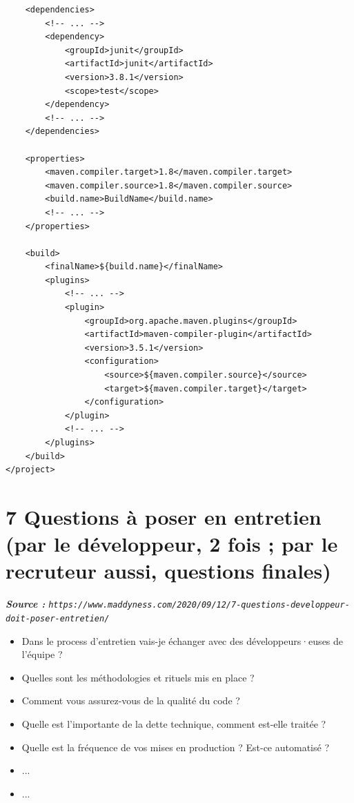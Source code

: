 \documentclass[11pt,twoside,a4paper]{article}
\begin{document}
\begin{landscape}
\begin{multicols}{2}
\begin{verbatim}
    <dependencies>
        <!-- ... -->
        <dependency>
            <groupId>junit</groupId>
            <artifactId>junit</artifactId>
            <version>3.8.1</version>
            <scope>test</scope>
        </dependency>
        <!-- ... -->
    </dependencies>
    
    <properties>
        <maven.compiler.target>1.8</maven.compiler.target>
        <maven.compiler.source>1.8</maven.compiler.source>
        <build.name>BuildName</build.name>
        <!-- ... -->
    </properties>
    
    <build>
        <finalName>${build.name}</finalName>
        <plugins>
            <!-- ... -->
            <plugin>
                <groupId>org.apache.maven.plugins</groupId>
                <artifactId>maven-compiler-plugin</artifactId>
                <version>3.5.1</version>
                <configuration>
                    <source>${maven.compiler.source}</source>
                    <target>${maven.compiler.target}</target>
                </configuration>
            </plugin>
            <!-- ... -->
        </plugins>
    </build>
</project>
	\end{verbatim}
	\normalsize
	
	\vfill
	\columnbreak
	
	\section*{7 Questions {\`a} poser en entretien (par le d{\'e}veloppeur, 2 fois ; par le recruteur aussi, questions finales)}
	
	\emph{\footnotesize \textbf{Source : } \texttt{https://www.maddyness.com/2020/09/12/7-questions-developpeur-doit-poser-entretien/} }
	\begin{itemize}
		\item Dans le process d'entretien vais-je {\'e}changer avec des d{\'e}veloppeurs·euses de l'{\'e}quipe ? 
		\item Quelles sont les m{\'e}thodologies et rituels mis en place ?
		\item Comment vous assurez-vous de la qualit{\'e} du code ?
		\item Quelle est l'importante de la dette technique, comment est-elle trait{\'e}e ?
		\item Quelle est la fr{\'e}quence de vos mises en production ? Est-ce automatis{\'e} ?
		\item ... 
		\item ... 
	\end{itemize}
	

\end{multicols}
\end{landscape}
\end{document}
